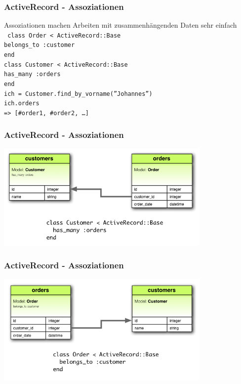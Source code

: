 \begin{frame}
  \frametitle{ActiveRecord - Assoziationen}
  Assoziationen machen Arbeiten mit zusammenhängenden Daten sehr einfach \\
  \tt \small
  \vspace{0.5cm}
  class Order < ActiveRecord::Base \\
  \enskip belongs\_to :customer \\
  end \\
  \vspace{0.3cm}
  class Customer < ActiveRecord::Base \\
  \enskip has\_many :orders \\
  end \\
  \vspace{0.5cm}
  ich = Customer.find\_by\_vorname(''Johannes'') \\
  ich.orders \\
  {\color{green}=> [\#order1, \#order2, \ldots]}
\end{frame}

\begin{frame}
  \frametitle{ActiveRecord - Assoziationen}
  \begin{center}
    \includegraphics[width=10.5cm]{img/has_many.png}
  \end{center}
\end{frame}

\begin{frame}
  \frametitle{ActiveRecord - Assoziationen}
  \begin{center}
    \includegraphics[width=10.5cm]{img/belongs_to.png}
  \end{center}
\end{frame}

